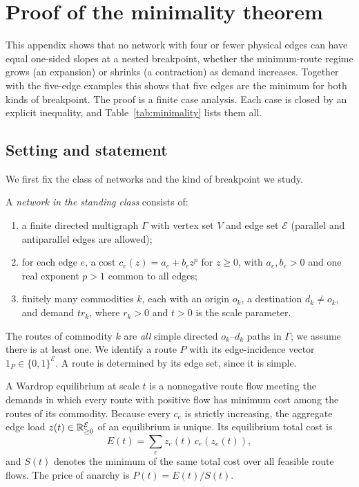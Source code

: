 \section{Proof of the minimality theorem}\label{app:minimality}\label{sec:minimality}

This appendix shows that no network with four or fewer physical edges can have
equal one-sided slopes at a nested breakpoint, whether the minimum-route
regime grows (an expansion) or shrinks (a contraction) as demand increases.
Together with the five-edge examples this shows that five edges are the
minimum for both kinds of breakpoint. The proof is a finite case analysis.
Each case is closed by an explicit inequality, and Table~\ref{tab:minimality}
lists them all.

\subsection{Setting and statement}

We first fix the class of networks and the kind of breakpoint we study.

\begin{definition}\label{def:standing}
A \emph{network in the standing class} consists of:
\begin{enumerate}
\item a finite directed multigraph $\Gamma$ with vertex set $V$ and edge set
 $\mathcal E$ (parallel and antiparallel edges are allowed);
\item for each edge $e$, a cost $c_e(z)=a_e+b_ez^p$ for $z\ge0$, with
 $a_e,b_e>0$ and one real exponent $p>1$ common to all edges;
\item finitely many commodities $k$, each with an origin $o_k$, a destination
 $d_k\ne o_k$, and demand $tr_k$, where $r_k>0$ and $t>0$ is the scale
 parameter.
\end{enumerate}
The routes of commodity $k$ are \emph{all} simple directed $o_k$--$d_k$
paths in $\Gamma$; we assume there is at least one. We identify a route $P$
with its edge-incidence vector $1_P\in\{0,1\}^{\mathcal E}$. A route is
determined by its edge set, since it is simple.
\end{definition}

A Wardrop equilibrium at scale $t$ is a nonnegative route flow meeting the
demands in which every route with positive flow has minimum cost among the
routes of its commodity. Because every $c_e$ is strictly increasing, the
aggregate edge load $z(t)\in\mathbb R^{\mathcal E}_{\ge0}$ of an equilibrium is
unique. Its equilibrium total cost is
\[
 E(t)=\sum_{e}z_e(t)\,c_e(z_e(t)),
\]
and $S(t)$ denotes the minimum of the same total cost over all feasible
route flows. The price of anarchy is $P(t)=E(t)/S(t)$.

